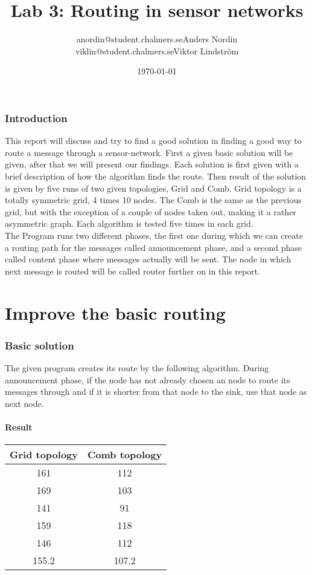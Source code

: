 \documentclass{article}
\title{Lab 3: Routing in sensor networks}
\author{anordin@student.chalmers.se\quad Anders Nordin\\
        viklin@student.chalmers.se\quad Viktor Lindstr\"{o}m}
\date{\today}
\begin{document}
\maketitle
\newpage
\tableofcontents
\newpage
\section{Introduction}
  This report will discuss and try to find a good solution in finding a 
  good way to route a message through a sensor-network.
  First a given basic solution will be given, after that
  we will present our findings. Each solution is first given with
  a brief description of how the algorithm finds the route. Then 
  result of the solution is given by five runs of two given topologies,
  Grid and Comb. Grid topology is a totally symmetric grid, 4 times 10 nodes.
  The Comb is the same as the previous grid, but with the exception of
  a couple of nodes taken out, making it a rather asymmetric graph.
  Each algorithm is tested five times in each grid.\\
  The Program runs two different phases, the first one during 
  which we can create a routing path for the messages called 
  announcement phase, and a second phase called content phase where
  messages actually will be sent. The node in which next message
  is routed will be called router further on in this report.
\part{Improve the basic routing}
\section{Basic solution}
  The given program creates its route by the following algorithm.
  During announcement phase, if the node has not already chosen an 
  node to route its messages through and if it is shorter
  from that node to the sink, use that node as next node.
  \subsection{Result}
    \begin{tabular}{c|c}
      Grid topology & Comb topology\\
      \hline
      \hline
      161 & 112\\
      169 & 103\\
      141 & 91\\
      159 & 118\\
      146 & 112\\
      \hline
      155.2&107.2\\
    \end{tabular}
\end{document}

